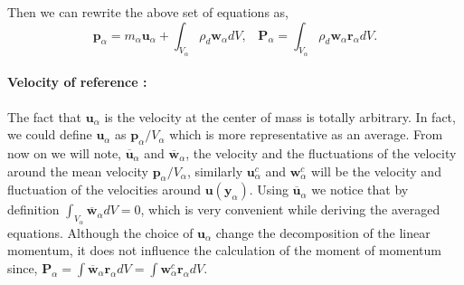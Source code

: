 Then we can rewrite the above set of equations as, 
\begin{equation}
    \bm{p}_\alpha = m_\alpha \bm{u}_\alpha 
    + \int_{V_\alpha} \rho_d \bm{w}_\alpha dV,\;\;\;
    \bm{P}_\alpha = \int_{V_\alpha} \rho_d \bm{w}_\alpha\bm{r}_\alpha dV.
    \label{eq:decomposition}
\end{equation}
\paragraph*{Velocity of reference :}
The fact that $\bm{u}_\alpha$ is the velocity at the center of mass is totally arbitrary.
In fact, we could define $\bm{u}_\alpha$ as $\bm{p}_\alpha / V_\alpha$ which is more representative 
as an average. 
From now on we will note, $\bm{\overline{u}}_\alpha$ and $\bm{\overline{w}}_\alpha$, the velocity and the fluctuations of 
the velocity around the mean velocity $\bm{p}_\alpha/V_\alpha$, similarly 
$\bm{u}^c_\alpha$ and $\bm{w}^c_\alpha$ will be the velocity and fluctuation of the velocities around 
$\bm{u}(\bm{y}_\alpha)$.
Using $\bm{\overline{u}}_\alpha$ we notice that by definition 
$\int_{V_\alpha} \bm{\overline{w}}_\alpha dV = 0$, which is very convenient while deriving the averaged equations. 
Although the choice of $\bm{u}_\alpha$ change the decomposition of the linear momentum,
it does not influence the calculation of the moment of momentum since,
$\bm{P}_\alpha = \int \bm{\overline{w}}_\alpha\bm{r}_\alpha dV = \int \bm{w}^c_\alpha\bm{r}_\alpha dV$.

